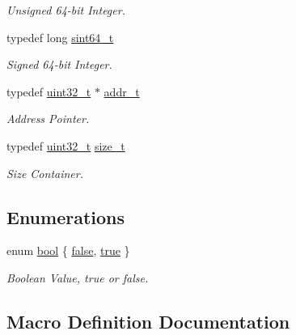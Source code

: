 \begin{DoxyCompactItemize}
\begin{DoxyCompactList}\small\item\em Unsigned 64-\/bit Integer. \end{DoxyCompactList}\item 
typedef long \hyperlink{a00047_a04761b9e7480e1e48b0d392da17fd5d4_a04761b9e7480e1e48b0d392da17fd5d4}{sint64\+\_\+t}
\begin{DoxyCompactList}\small\item\em Signed 64-\/bit Integer. \end{DoxyCompactList}\item 
typedef \hyperlink{a00047_a435d1572bf3f880d55459d9805097f62_a435d1572bf3f880d55459d9805097f62}{uint32\+\_\+t} $\ast$ \hyperlink{a00047_a295f71165288684c38c6bb836fbb3c59_a295f71165288684c38c6bb836fbb3c59}{addr\+\_\+t}
\begin{DoxyCompactList}\small\item\em Address Pointer. \end{DoxyCompactList}\item 
typedef \hyperlink{a00047_a435d1572bf3f880d55459d9805097f62_a435d1572bf3f880d55459d9805097f62}{uint32\+\_\+t} \hyperlink{a00047_a29d85914ddff32967d85ada69854206d_a29d85914ddff32967d85ada69854206d}{size\+\_\+t}
\begin{DoxyCompactList}\small\item\em Size Container. \end{DoxyCompactList}\end{DoxyCompactItemize}
\subsection*{Enumerations}
\begin{DoxyCompactItemize}
\item 
enum \hyperlink{a00047_af6a258d8f3ee5206d682d799316314b1_af6a258d8f3ee5206d682d799316314b1}{bool} \{ \hyperlink{a00047_af6a258d8f3ee5206d682d799316314b1_af6a258d8f3ee5206d682d799316314b1ae9de385ef6fe9bf3360d1038396b884c}{false}, 
\hyperlink{a00047_af6a258d8f3ee5206d682d799316314b1_af6a258d8f3ee5206d682d799316314b1a08f175a5505a10b9ed657defeb050e4b}{true}
 \}\begin{DoxyCompactList}\small\item\em Boolean Value, true or false. \end{DoxyCompactList}
\end{DoxyCompactItemize}


\subsection{Macro Definition Documentation}
\mbox{\label{a00047_a0a63db19c3e2153ed419aeccf4e33c92_a0a63db19c3e2153ed419aeccf4e33c92}} 
